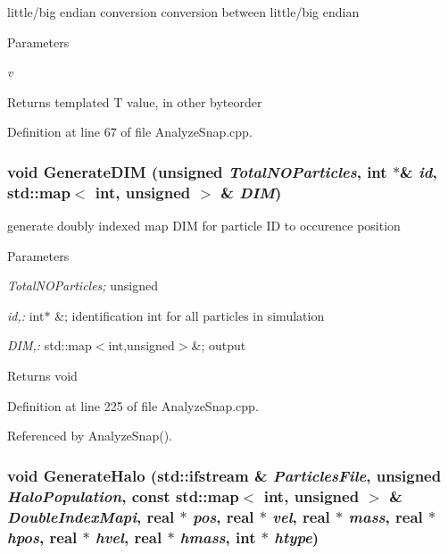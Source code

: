 little/big endian conversion conversion between little/big endian 


\begin{DoxyParams}{Parameters}
\item[{\em v}]\end{DoxyParams}
\begin{DoxyReturn}{Returns}
templated T value, in other byteorder 
\end{DoxyReturn}


Definition at line 67 of file AnalyzeSnap.cpp.

\subsubsection[{GenerateDIM}]{\setlength{\rightskip}{0pt plus 5cm}void GenerateDIM (unsigned {\em TotalNOParticles}, \/  int $\ast$\& {\em id}, \/  std::map$<$ int, unsigned $>$ \& {\em DIM})}\label{AnalyzeSnap_8cpp_acfcefc58f51f28a6592e2f50e067881a}


generate doubly indexed map DIM for particle ID to occurence position 


\begin{DoxyParams}{Parameters}
\item[{\em TotalNOParticles;}]unsigned \item[{\em id,:}]int$\ast$ \&; identification int for all particles in simulation \item[{\em DIM,:}]std::map$<$int,unsigned$>$\&; output \end{DoxyParams}
\begin{DoxyReturn}{Returns}
void 
\end{DoxyReturn}


Definition at line 225 of file AnalyzeSnap.cpp.



Referenced by AnalyzeSnap().

\subsubsection[{GenerateHalo}]{\setlength{\rightskip}{0pt plus 5cm}void GenerateHalo (std::ifstream \& {\em ParticlesFile}, \/  unsigned {\em HaloPopulation}, \/  const std::map$<$ int, unsigned $>$ \& {\em DoubleIndexMapi}, \/  {\bf real} $\ast$ {\em pos}, \/  {\bf real} $\ast$ {\em vel}, \/  {\bf real} $\ast$ {\em mass}, \/  {\bf real} $\ast$ {\em hpos}, \/  {\bf real} $\ast$ {\em hvel}, \/  {\bf real} $\ast$ {\em hmass}, \/  int $\ast$ {\em htype})}\label{AnalyzeSnap_8cpp_ab9fb580fd4661772d21457471910d0c1}



